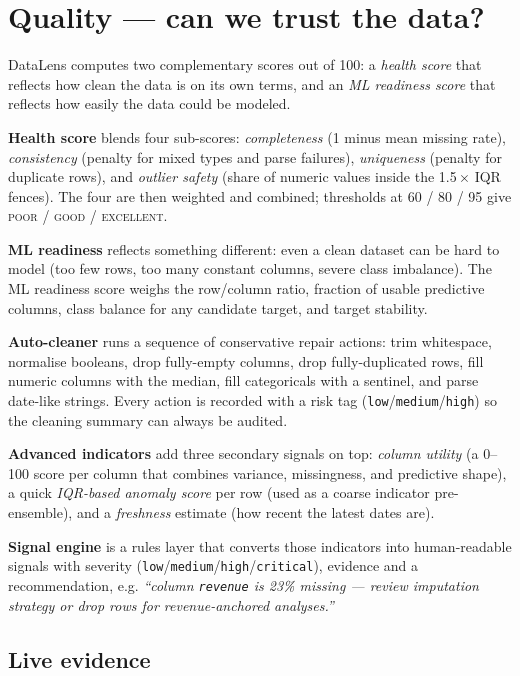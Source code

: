 \documentclass[11pt,a4paper]{article}
\begin{document}
\section{Quality --- can we trust the data?}\label{sec:quality}

DataLens computes two complementary scores out of 100: a \emph{health score} that reflects how clean the data is on its own terms, and an \emph{ML readiness score} that reflects how easily the data could be modeled.

\textbf{Health score} blends four sub-scores: \textit{completeness} (1 minus mean missing rate), \textit{consistency} (penalty for mixed types and parse failures), \textit{uniqueness} (penalty for duplicate rows), and \textit{outlier safety} (share of numeric values inside the 1.5\,$\times$ IQR fences). The four are then weighted and combined; thresholds at 60 / 80 / 95 give \textsc{poor} / \textsc{good} / \textsc{excellent}.

\textbf{ML readiness} reflects something different: even a clean dataset can be hard to model (too few rows, too many constant columns, severe class imbalance). The ML readiness score weighs the row/column ratio, fraction of usable predictive columns, class balance for any candidate target, and target stability.

\textbf{Auto-cleaner} runs a sequence of conservative repair actions: trim whitespace, normalise booleans, drop fully-empty columns, drop fully-duplicated rows, fill numeric columns with the median, fill categoricals with a sentinel, and parse date-like strings. Every action is recorded with a risk tag (\texttt{low}/\texttt{medium}/\texttt{high}) so the cleaning summary can always be audited.

\textbf{Advanced indicators} add three secondary signals on top: \emph{column utility} (a 0--100 score per column that combines variance, missingness, and predictive shape), a quick \emph{IQR-based anomaly score} per row (used as a coarse indicator pre-ensemble), and a \emph{freshness} estimate (how recent the latest dates are).

\textbf{Signal engine} is a rules layer that converts those indicators into human-readable signals with severity (\texttt{low}/\texttt{medium}/\texttt{high}/\texttt{critical}), evidence and a recommendation, e.g. \textit{``column \texttt{revenue} is 23\% missing --- review imputation strategy or drop rows for revenue-anchored analyses.''}

\subsection{Live evidence}
\end{document}
